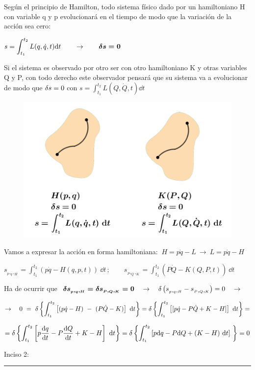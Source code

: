  \vspace{5mm}
 \begin{multicols}{2}
Según el principio de Hamilton, todo sistema físico dado por un hamiltoniano H con variable q y p evolucionará en el tiempo de modo que la variación de la acción sea cero:

$s=\displaystyle \int_{t_1}^{t_2} L(q,\dot q,t) \dd t \qquad \to \qquad \boldsymbol{ \var s=0 }$


Si el sistema es observado por otro ser con otro hamiltoniano K y otras variables Q y P, con todo derecho este observador pensará que su sistema va a evolucionar de modo que $\var s=0$ con $s=\displaystyle \int_{t_1}^{t_2} L(Q,\dot Q,t) \dd t $

\begin{figure}[H]
	\centering
	\includegraphics[width=.5\textwidth]{imagenes/img19-01.png}
\end{figure}
\end{multicols}


Vamos a expresar la acción en forma hamiltoniana: $\ H=p\dot q - L \ \to  \ L=p\dot q - H$

$\displaystyle s_{_p,_q,_H}=\int_{t_1}^{t_2} (p\dot q-H(q,p,t)) \ \dd t \, ; \qquad s_{_P,_Q,_K}=\int_{t_1}^{t_2} (P\dot Q-K(Q,P,t)) \ \dd t$

Ha de ocurrir que $\ \boldsymbol{ \var s_{_p,_q,_H} = \var s_{_P,_Q,_K}   = 0 } \quad \to \quad \var \left( s_{_p,_q,_H}- s_{_P,_Q,_K} \right)=0 \quad \to $

$\to \quad 0\ =\  \displaystyle \var \left\{  \int_{t_1}^{t_2} \left[ (p\dot q-H) \ - \ (P\dot Q-K)\right] \ \dd t
\right\} = 
\var \left\{  \int_{t_1}^{t_2} \left[ [p\dot q - P\dot Q +K-H] \right] \ \dd t
\right\} =  $

$\displaystyle =
\var \left\{  \int_{t_1}^{t_2} \left[ p\dv{q}{t} - P\dv{Q}{t} + K - H \right] \ \dd t
\right\} = 
\var \left\{  \int_{t_1}^{t_2} \left[ p\dd q - P\dd Q + (K-H)\ \dd t \right] \ 
\right\} =0 
$
 
\vspace{5mm} Inciso 2: $\quad$  \rule{200pt}{0.1pt} 

